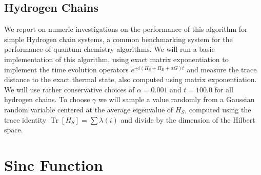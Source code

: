 \documentclass{article}
\newcommand{\brackets}[1]{\left[ #1 \right]}
\DeclareMathOperator{\Tr}{Tr}
\newcommand{\trace}[1]{\Tr \brackets{ #1 }}
\begin{document}
 \subsection{Hydrogen Chains}
 We report on numeric investigations on the performance of this algorithm for simple Hydrogen chain systems, a common benchmarking system for the performance of quantum chemistry algorithms. We will run a basic implementation of this algorithm, using exact matrix exponentiation to implement the time evolution operators $e^{\pm i (H_S + H_E + \alpha G)t}$ and measure the trace distance to the exact thermal state, also computed using matrix exponentiation. We will use rather conservative choices of $\alpha = 0.001$ and $t = 100.0$ for all hydrogen chains. To choose $\gamma$ we will sample a value randomly from a Gaussian random variable centered at the average eigenvalue of $H_S$, computed using the trace identity $\trace{H_S} = \sum \lambda(i)$ and divide by the dimension of the Hilbert space. 




\appendix



\section{Sinc Function}
\end{document}
